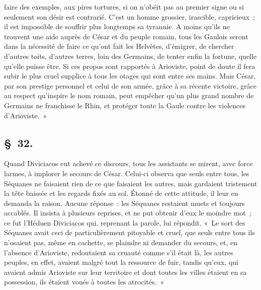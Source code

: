 \documentclass[french,twoside]{book} %
\begin{document}
faire des exemples, aux pires tortures, si on n’obéit pas au premier signe ou si seulement son désir est contrarié. C'est un homme grossier, irascible, capricieux ; il est impossible de souffrir plus longtemps sa tyrannie. A moins qu’ils ne trouvent une aide auprès de César et du peuple romain, tous les Gaulois seront dans la nécessité de faire ce qu’ont fait les Helvètes, d’émigrer, de chercher d’autres toits, d’autres terres, loin des Germains, de tenter enfin la fortune, quelle qu’elle puisse être. Si ces propos sont rapportés à Arioviste, point de doute il fera subir le plus cruel supplice à tous les otages qui sont entre ses mains. Mais César, par son prestige personnel et celui de son armée, grâce à sa récente victoire, grâce au respect qu’inspire le nom romain, peut empêcher qu’un plus grand nombre de Germains ne franchisse le Rhin, et protéger toute la Gaule contre les violences d’Arioviste. »
\subsection[{§ 32.}]{ \textsc{§ 32.} }
\noindent Quand Diviciacos eut achevé ce discours, tous les assistants se mirent, avec force larmes, à implorer le secours de César. Celui-ci observa que seuls entre tous, les Séquanes ne faisaient rien de ce que faisaient les autres, mais gardaient tristement la tête baissée et les regards fixés au sol. Étonné de cette attitude, il leur en demanda la raison. Aucune réponse : les Séquanes restaient muets et toujours accablés. Il insista à plusieurs reprises, et ne put obtenir d’eux le moindre mot ; ce fut l’Héduen Diviciacos qui, reprenant la parole, lui répondit. « Le sort des Séquanes avait ceci de particulièrement pitoyable et cruel, que seuls entre tous ils n’osaient pas, même en cachette, se plaindre ni demander du secours, et, en l’absence d’Arioviste, redoutaient sa cruauté comme s’il était là, les autres peuples, en effet, avaient malgré tout la ressource de fuir, tandis qu’eux, qui avaient admis Arioviste sur leur territoire et dont toutes les villes étaient en sa possession, ils étaient voués à toutes les atrocités. »
\end{document}
